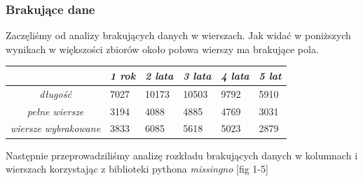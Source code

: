 \documentclass[11pt]{article}
\begin{document}
\subsubsection{Brakujące dane}
Zaczęliśmy od analizy brakujących danych w wierszach. Jak widać w poniższych wynikach w większości zbiorów około połowa wierszy ma brakujące pola.
\begin{center}
\begin{tabular}{|c|m{0.7in}|m{0.7in}|m{0.7in}|m{0.7in}|m{0.7in}|}
	\hline
	& \textit{1 rok} & \textit{2 lata} & \textit{3 lata} & \textit{4 lata} & \textit{5 lat} \\ \hline
	\textit{długość} & 7027 & 10173 & 10503 & 9792 & 5910 \\ \hline
	\textit{pełne wiersze} & 3194 & 4088 & 4885 & 4769 & 3031 \\ \hline
	\textit{wiersze wybrakowane} & 3833 & 6085 & 5618 & 5023 & 2879 \\ \hline
\end{tabular}
\end{center}
Następnie przeprowadziliśmy analizę rozkładu brakujących danych w kolumnach i wierszach korzystając z biblioteki pythona \textit{missingno} [fig 1-5]\\
\end{document}
